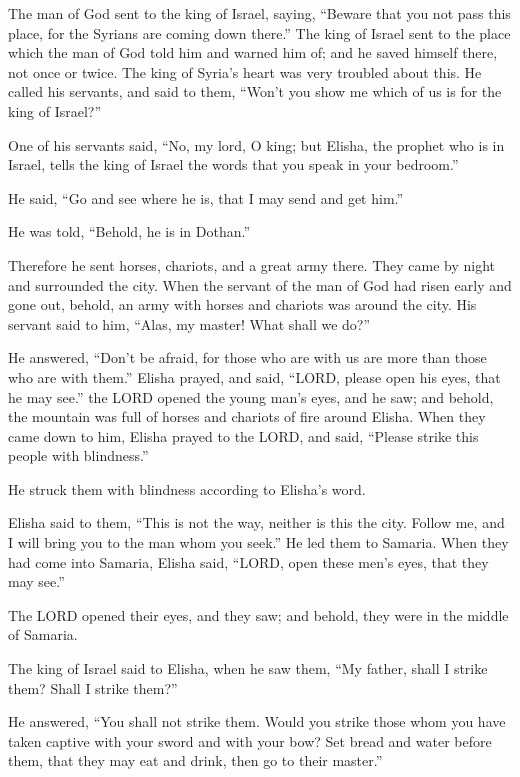 \myverse{}The man of God sent to the king of Israel, saying, “Beware that
you not pass this place, for the Syrians are coming down there.”
\myverse{}The king of Israel sent to the place which the man of God told him and warned
him of; and he saved himself there, not once or twice.
\myverse{}The king of Syria’s heart was very troubled about this. He called his servants,
and said to them, “Won’t you show me which of us is for the king of Israel?”

\myverse{}One of his servants said, “No, my lord, O king; but Elisha, the
prophet who is in Israel, tells the king of Israel the words that you speak in your bedroom.”

\myverse{}He said, “Go and see where he is, that I may send and get him.”

He was told, “Behold, he is in Dothan.”

\myverse{}Therefore he sent horses, chariots, and a great army there. They
came by night and surrounded the city.
\myverse{}When the servant of the man of God had risen early and gone out, behold, an
army with horses and chariots was around the city. His servant said to him, “Alas, my master! What shall
we do?”

\myverse{}He answered, “Don’t be afraid, for those who are with us are
more than those who are with them.”
\myverse{}Elisha prayed, and said, “LORD, please open his eyes, that he may see.” the
LORD opened the young man’s eyes, and he saw; and behold, the mountain was full of horses and chariots
of fire around Elisha.
\myverse{}When they came down to him, Elisha prayed to the LORD, and said, “Please strike
this people with blindness.”

He struck them with blindness according to Elisha’s word.

\myverse{}Elisha said to them, “This is not the way, neither is this the
city. Follow me, and I will bring you to the man whom you seek.” He led them to Samaria.
\myverse{}When they had come into Samaria, Elisha said, “LORD, open these men’s eyes,
that they may see.”

The LORD opened their eyes, and they saw; and behold, they were in the middle of Samaria.

\myverse{}The king of Israel said to Elisha, when he saw them, “My father,
shall I strike them? Shall I strike them?”

\myverse{}He answered, “You shall not strike them. Would you strike those
whom you have taken captive with your sword and with your bow? Set bread and water before them, that they
may eat and drink, then go to their master.”

